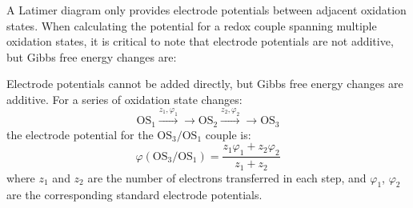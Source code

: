 A Latimer diagram only provides electrode potentials between adjacent oxidation states. When calculating the potential for a redox couple spanning multiple oxidation states, it is critical to note that electrode potentials are not additive, but Gibbs free energy changes are:

\begin{proposition}
Electrode potentials cannot be added directly, but Gibbs free energy changes are additive. For a series of oxidation state changes:
$$\text{OS}_1 \xrightarrow{z_1, \varphi_1}{\rightarrow} \text{OS}_2 \xrightarrow{z_2, \varphi_2}{\rightarrow} \text{OS}_3$$
the electrode potential for the $\text{OS}_3/\text{OS}_1$ couple is:
$$\varphi(\text{OS}_3/\text{OS}_1) = \frac{z_1\varphi_1 + z_2\varphi_2}{z_1 + z_2}$$
where $z_1$ and $z_2$ are the number of electrons transferred in each step, and $\varphi_1$, $\varphi_2$ are the corresponding standard electrode potentials.
\end{proposition}

